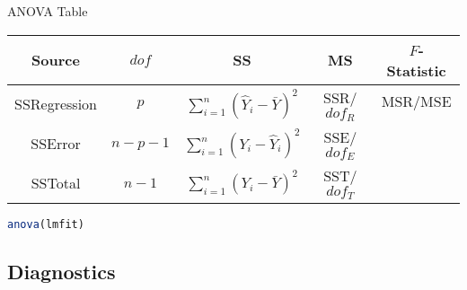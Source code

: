 \begin{point}
    ANOVA Table
\end{point}

    \begin{table}[H]
        \centering
        \renewcommand\arraystretch{1}
        \begin{tabular}{c|cccc}
            \hline
            Source&$ dof $&SS&MS&$ F $-Statistic\\\hline
            SSRegression&$ p $&$ \sum_{i=1}^n(\hat{Y}_i-\bar{Y})^2  $&SSR/$ dof_R $& $ \mathrm{MSR}/\mathrm{MSE} $\\
            SSError&$ n-p-1 $&$ \sum_{i=1}^n(Y_i-\hat{Y}_i)^2  $&SSE/$ dof_E $& \\
            SSTotal&$ n-1 $&$ \sum_{i=1}^n(Y_i-\bar{Y})^2  $&SST/$ dof_T $& \\
            \hline
        \end{tabular}
    \end{table}
\begin{rcode}
    \begin{lstlisting}[language=R]
anova(lmfit)
    \end{lstlisting}
\end{rcode}    




     




\subsection{Diagnostics}\label{SubSectionDiagnosticsForMonoModel}


\providecommand{\cmark}[2][]{%
  \begin{pgfonlayer}{marx}
    \node [nmark] at (c#2#1) {#2};
  \end{pgfonlayer}{marx}
  } 
\providecommand{\cmark}[2][]{\relax} 

